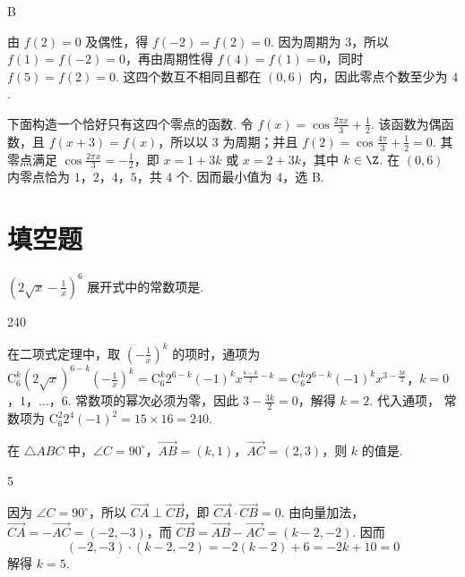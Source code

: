 \begin{answer}
B
\end{answer}

\begin{solution}
由 \(f(2)=0\) 及偶性，得 \(f(-2)=f(2)=0\). 因为周期为 \(3\)，所以
\(f(1)=f(-2)=0\)，再由周期性得 \(f(4)=f(1)=0\)，同时
\(f(5)=f(2)=0\). 这四个数互不相同且都在 \((0,6)\) 内，因此零点个数至少为
\(4\).

下面构造一个恰好只有这四个零点的函数. 令
\(f(x)=\cos\frac{2\pi x}{3}+\frac{1}{2}\). 该函数为偶函数，且
\(f(x+3)=f(x)\)，所以以 \(3\) 为周期；并且
\(f(2)=\cos\frac{4\pi}{3}+\frac{1}{2}=0\). 其零点满足
\(\cos\frac{2\pi x}{3}=-\frac{1}{2}\)，即
\(x=1+3k\) 或 \(x=2+3k\)，其中 \(k\in\Z\). 在 \((0,6)\) 内零点恰为
\(1\)，\(2\)，\(4\)，\(5\)，共 \(4\) 个. 因而最小值为 \(4\)，选 B.
\end{solution}

\section{填空题}
\begin{problem}
\(\left(2\sqrt{x} -\frac{1}{x}\right)^6\) 展开式中的常数项是\fillinblank{}.
\end{problem}

\begin{answer}
240
\end{answer}

\begin{solution}
在二项式定理中，取 \(\left(-\frac{1}{x}\right)^k\) 的项时，通项为
\(\mathrm C_{6}^{k}(2\sqrt{x})^{6-k}\left(-\frac{1}{x}\right)^{k} =\mathrm C_{6}^{k}2^{6-k}(-1)^k x^{\frac{6-k}{2}-k} =\mathrm C_{6}^{k}2^{6-k}(-1)^k x^{3-\frac{3k}{2}}\)，\(k=0\)，\(1\)，\(\ldots\)，\(6\).
常数项的幂次必须为零，因此 \(3-\frac{3k}{2}=0\)，解得 \(k=2\). 代入通项，
常数项为 \(\mathrm C_{6}^{2}2^{4}(-1)^2=15\times16=240\).
\end{solution}

\begin{problem}
在 \(\triangle ABC\) 中，\(\angle C = 90^{\circ}\)，\(\overrightarrow{AB} = (k,1)\)，\(\overrightarrow{AC} = (2,3)\)，则 \(k\) 的值是\fillinblank{}.

\end{problem}

\begin{answer}
5
\end{answer}

\begin{solution}
因为 \(\angle C=90^{\circ}\)，所以 \(\overrightarrow{CA}\perp\overrightarrow{CB}\)，即
\(\overrightarrow{CA}\cdot\overrightarrow{CB}=0\). 由向量加法，
\(\overrightarrow{CA}=-\overrightarrow{AC}=(-2,-3)\)，而
\(\overrightarrow{CB}=\overrightarrow{AB}-\overrightarrow{AC}=(k-2,-2)\). 因而
\[
\left(-2,-3\right)\cdot(k-2,-2)=-2(k-2)+6=-2k+10=0
\]
解得 \(k=5\).
\end{solution}

